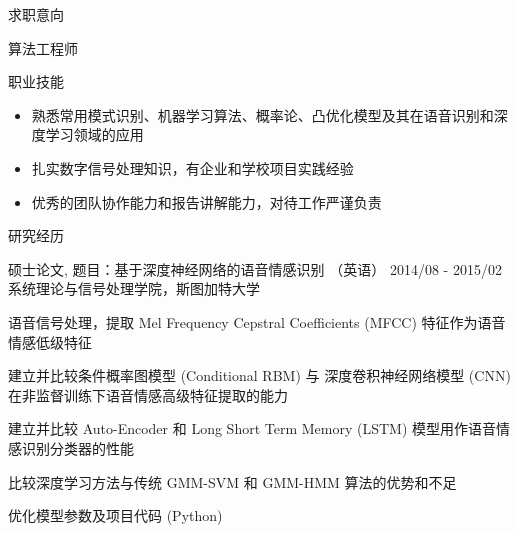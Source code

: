 \documentclass{resume} %
\begin{document}
\begin{CJK*}{UTF8}{gbsn}
 
\begin{rSection}{求职意向} 

算法工程师

\end{rSection}


 
\begin{rSection}{职业技能}  
\begin{itemize}
\item 熟悉常用模式识别、机器学习算法、概率论、凸优化模型及其在语音识别和深度学习领域的应用
\item 扎实数字信号处理知识，有企业和学校项目实践经验
\item 优秀的团队协作能力和报告讲解能力，对待工作严谨负责
\end{itemize}
\end{rSection}


\begin{rSection}{研究经历}

\begin{rSubsection}{硕士论文,  题目：基于深度神经网络的语音情感识别 （英语）
}{2014/08 - 2015/02}{系统理论与信号处理学院，斯图加特大学}{}

\item 语音信号处理，提取 Mel Frequency Cepstral Coefficients (MFCC) 特征作为语音情感低级特征
\item 建立并比较条件概率图模型 (Conditional RBM) 与 深度卷积神经网络模型 (CNN) 在非监督训练下语音情感高级特征提取的能力
\item 建立并比较 Auto-Encoder 和 Long Short Term Memory (LSTM) 模型用作语音情感识别分类器的性能
\item 比较深度学习方法与传统 GMM-SVM 和 GMM-HMM 算法的优势和不足
\item 优化模型参数及项目代码 (Python)


\end{rSubsection}
\end{rSection}
\end{CJK*}
\end{document}
